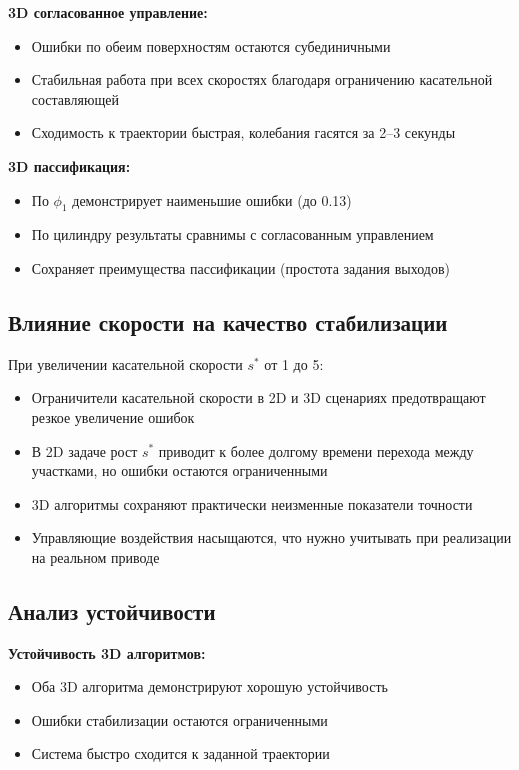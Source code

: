\textbf{3D согласованное управление:}
\begin{itemize}
\item Ошибки по обеим поверхностям остаются субединичными
\item Стабильная работа при всех скоростях благодаря ограничению касательной составляющей
\item Сходимость к траектории быстрая, колебания гасятся за 2--3 секунды
\end{itemize}

\textbf{3D пассификация:}
\begin{itemize}
\item По $\phi_1$ демонстрирует наименьшие ошибки (до 0.13)
\item По цилиндру результаты сравнимы с согласованным управлением
\item Сохраняет преимущества пассификации (простота задания выходов)
\end{itemize}

\subsection{Влияние скорости на качество стабилизации}

При увеличении касательной скорости $s^*$ от 1 до 5:
\begin{itemize}
\item Ограничители касательной скорости в 2D и 3D сценариях предотвращают резкое увеличение ошибок
\item В 2D задаче рост $s^*$ приводит к более долгому времени перехода между участками, но ошибки остаются ограниченными
\item 3D алгоритмы сохраняют практически неизменные показатели точности
\item Управляющие воздействия насыщаются, что нужно учитывать при реализации на реальном приводе
\end{itemize}

\subsection{Анализ устойчивости}

\textbf{Устойчивость 3D алгоритмов:}
\begin{itemize}
\item Оба 3D алгоритма демонстрируют хорошую устойчивость
\item Ошибки стабилизации остаются ограниченными
\item Система быстро сходится к заданной траектории
\end{itemize}

